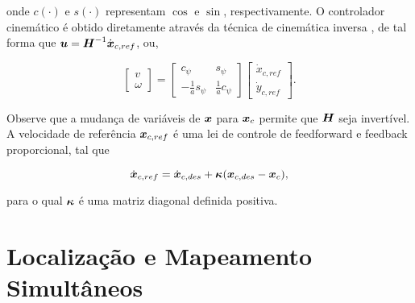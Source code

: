     \noindent onde \( c(\cdot) \) e \( s(\cdot) \) representam \( \cos \) e \( \sin \), respectivamente. O controlador cinemático é obtido diretamente através da técnica de cinemática inversa \cite{Sarcinelli-Filho2023_4}, de tal forma que \( \boldsymbol{u} = \boldsymbol{H}^{-1} \dot{\boldsymbol{x}}_{c,ref} \), ou,
    
    \begin{equation}
       \begin{bmatrix} v \\ \omega    \end{bmatrix} =  \begin{bmatrix} c_\psi & s_\psi \\ -\frac{1}{a}s_\psi & \frac{1}{a} c_\psi   \end{bmatrix} \begin{bmatrix}\dot{x}_{c,ref} \\ \dot{y}_{c,ref}   \end{bmatrix}.
       \label{eq:kinematic_controller_differential}
    \end{equation}
    
    Observe que a mudança de variáveis de \( \boldsymbol{x} \) para \( \boldsymbol{x}_c \) permite que \( \boldsymbol{H} \) seja invertível. A velocidade de referência \( \boldsymbol{x}_{c,ref} \) é uma lei de controle de feedforward e feedback proporcional, tal que
    
    \begin{equation}
        \dot{\boldsymbol{x}}_{c,ref} = \dot{\boldsymbol{x}}_{c,des} + \boldsymbol{\kappa}(\boldsymbol{x}_{c,des} - \boldsymbol{x}_c),
        \label{eq:ff_fb_law}
    \end{equation}
    
    \noindent para o qual \( \boldsymbol{\kappa} \) é uma matriz diagonal definida positiva.
    
    


    

\section{Localização e Mapeamento Simultâneos}

